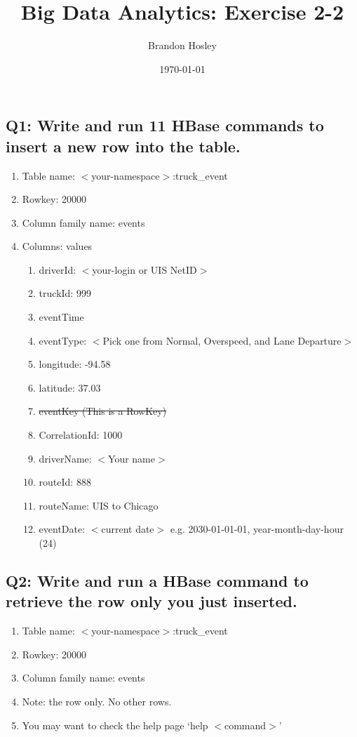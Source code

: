 \documentclass[]{article}
\title{Big Data Analytics: Exercise 2-2}
\author{Brandon Hosley}
\date{\today}
\begin{document}
\maketitle

\subsection*{Q1: Write and run 11 HBase commands to insert a new row into the table.} 
\begin{enumerate}[before=\itshape,font=\normalfont,label=\alph*.]
	\item Table name: $<$your-namespace$>$:truck\_event
	\item Rowkey: 20000
	\item Column family name: events
	\item Columns: values
	\begin{enumerate}[label=\roman*.]
		\item driverId: $<$your-login or UIS NetID$>$
		\item truckId: 999
		\item eventTime
		\item eventType: $<$Pick one from Normal, Overspeed, and Lane Departure$>$
		\item longitude: -94.58
		\item latitude: 37.03
		\item \sout{ eventKey (This is a RowKey) }
		\item CorrelationId: 1000
		\item driverName: $<$Your name$>$
		\item routeId: 888
		\item routeName: UIS to Chicago
		\item eventDate: $<$current date$>$ e.g. 2030-01-01-01, year-month-day-hour (24)
	\end{enumerate}
\end{enumerate}

\subsection*{Q2: Write and run a HBase command to retrieve the row only you just inserted.} 
\begin{enumerate}[before=\itshape,font=\normalfont,label=\alph*.]
	\item Table name: $<$your-namespace$>$:truck\_event
	\item Rowkey: 20000
	\item Column family name: events
	\item Note: the row only. No other rows.
	\item You may want to check the help page ‘help $<$command$>$’
\end{enumerate}
\end{document}
